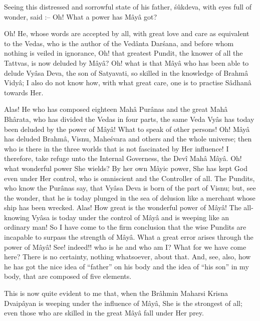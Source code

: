 Seeing this distressed and sorrowful state of his father, \'s\^ukdeva, with eyes full of wonder, said :-- Oh! What a power has M\^ay\^a got?

Oh!  He, whose words are accepted by all, with great love and care as equivalent to the Vedas, who is the author of the Ved\^anta Dar\'sana, and before whom nothing is veiled in ignorance, Oh! that greatest Pundit, the knower of all the Tattvas, is now deluded by M\^ay\^a? Oh! what is that M\^ay\^a who has been able to delude Vy\^asa Deva, the son of Satyavati, so skilled in the knowledge of Brahm\^a Vidy\^a; I also do not know how, with what great care, one is to practise S\^adhan\^a towards Her.

Alas! He who has composed eighteen Mah\^a Pur\^anas and the great Mah\^a Bh\^arata, who has divided the Vedas in four parts, the same Veda Vy\^as has today been deluded by the power of M\^ay\^a! What to speak of other persons! Oh! M\^ay\^a has deluded Brahm\^a, Visnu, Mahe\'svara and others and the whole universe; then who is there in the three worlds that is not fascinated by Her influence! I therefore, take refuge unto the Internal Governess, the Dev\^i Mah\^a M\^ay\^a. Oh! what wonderful power She wields? By her own M\^ayic power, She has kept God even under Her control, who is omniscient and the Controller of all. The Pundits, who know the Pur\^anas say, that Vy\^asa Deva is born of the part of Visnu; but, see the wonder, that he is today plunged in the sea of delusion like a merchant whose ship has been wrecked. Alas! How great is the wonderful power of M\^ay\^a! The all-knowing Vy\^asa is today under the control of M\^ay\^a and is weeping like an ordinary man! So I have come to the firm conclusion that the wise Pundits are incapable to surpass the strength of M\^ay\^a. What a great error arises through the power of M\^ay\^a! See! indeed!! who is he and who am I? What for we have come here? There is no certainty, nothing whatsoever, about that. And, see, also, how he has got the nice idea of ``father'' on his body and the idea of ``his son'' in my body, that are composed of five elements.

This is now quite evident to me that, when the Br\^ahmin Maharsi Krisna Dvaip\^ayan is weeping under the influence of M\^ay\^a, She is the strongest of all; even those who are skilled in the great M\^ay\^a fall under Her prey.


